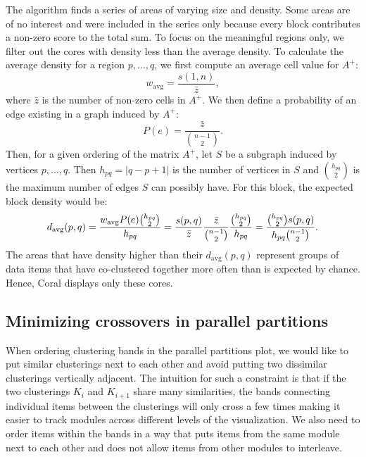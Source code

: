 \documentclass[12pt]{cmuthesis}
\newcommand\Coral{Coral\xspace}
\begin{document}

  The algorithm finds a series of areas of varying size and density. Some areas are of no interest and were included in the series only because every block contributes a non-zero score to the total sum. To focus on the meaningful regions only, we filter out the cores with density less than the average density. To calculate the average density for a region $p, \ldots, q$, we first compute an average cell value for $A^{+}$:
  \[
  w_{\textrm{avg}} = \frac{ s(1, n) } { \bar{z} },
  \]
  where $\bar{z}$ is the number of non-zero cells in $A^{+}$. We then define a probability of an edge existing in a graph induced by $A^{+}$: 
  \[
  P(e) = \frac{\bar{z}}{ {n-1 \choose 2} }.
  \]
  Then, for a given ordering of the matrix $A^{+}$, let $S$ be a subgraph induced by vertices $p, \ldots, q$. Then $h_{pq} = |q-p+1|$ is the number of vertices in $S$ and $h_{pq} \choose 2$ is the maximum number of edges $S$ can possibly have. For this block, the expected block density would be:
  \begin{align*}
  d_{\textrm{\scriptsize avg}}(p, q) =
    \frac{w_{\textrm{avg}} P(e) {h_{pq} \choose 2} }{h_{pq}} =
    \frac{ s(p,q) } { \bar{z} }
          \frac{ \bar{z} }{ {n-1 \choose 2} }
          \frac{ {h_{pq} \choose 2} }{ h_{pq}}
    = \frac{ {h_{pq} \choose 2} s(p,q)}{ h_{pq} {n-1 \choose 2} }.
  \end{align*}
  The areas that have density higher than their $d_{\textrm{avg}}(p,q)$ represent groups of data items that have co-clustered together more often than is expected by chance. Hence, \Coral displays only these cores.

  \subsection{Minimizing crossovers in parallel partitions}

  When ordering clustering bands in the parallel partitions plot, we would like to put similar clusterings next to each other and avoid putting two dissimilar clusterings vertically adjacent. The intuition for such a constraint is that if the two clusterings $K_{i}$ and $K_{i+1}$ share many similarities, the bands connecting individual items between the clusterings will only cross a few times making it easier to track modules across different levels of the visualization. We also need to order items within the bands in a way that puts items from the same module next to each other and does not allow items from other modules to interleave.
\end{document}
